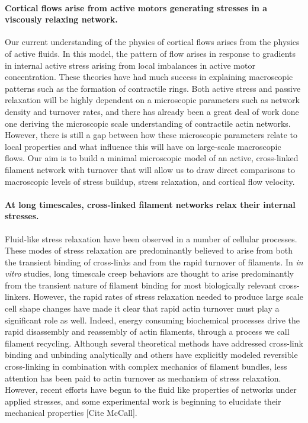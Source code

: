 \documentclass[10pt,letterpaper]{article}
\begin{document}
\paragraph{Cortical flows arise from active motors generating stresses in a viscously relaxing network.}  Our current understanding of the physics of cortical flows arises from the physics of active fluids\cite{cellmech_flows}.  In this model, the pattern of flow arises in response to gradients in internal active stress arising from local imbalances in active motor concentration\cite{PhysRevLett.106.028103}.  These theories have had much success in explaining macroscopic patterns such as the formation of contractile rings\cite{PhysRevLett.103.058102}.  Both active stress and passive relaxation will be highly dependent on a microscopic parameters such as network density and turnover rates, and there has already been a great deal of work done one deriving the microscopic scale understanding of contractile actin networks.  However, there is still a gap between how these microscopic parameters relate to local properties and what influence this will have on large-scale macroscopic flows.   Our aim is to build a minimal microscopic model of an active, cross-linked filament network with turnover that will allow us to draw direct comparisons to macroscopic levels of stress buildup, stress relaxation, and cortical flow velocity.


\paragraph{At long timescales, cross-linked filament networks relax their internal stresses.} Fluid-like stress relaxation have been observed in a number of cellular processes\cite{cellmech_flows,cellmech_flows2,cellmech_flows3,rheo_fluid,rheo_fluid2,cell_rheo_exp}.  These modes of stress relaxation are predominantly believed to arise from both the transient binding of cross-links and from the rapid turnover of filaments.  In {\em in vitro} studies, long timescale creep behaviors are thought to arise predominantly from the transient nature of filament binding for most biologically relevant cross-linkers\cite{rheo_crosslinksmatter,rheo_crosslinkslip1,rheo_crosslinkslip2,rheo_crosslinkslip3,rheo_nonaffine}.  However, the rapid rates of stress relaxation needed to produce large scale cell shape changes have made it clear that rapid actin turnover must play a significant role as well.  Indeed, energy consuming biochemical processes drive the rapid disassembly and reassembly of actin filaments, through a process we call filament recycling.   Although several theoretical methods have addressed cross-link binding and unbinding analytically \cite{theo_crosslinkslip1,theo_crosslinkslip2} and others have explicitly modeled reversible cross-linking in combination with complex mechanics of filament bundles\cite{model_taeyoon,rheo_crosslinkslip2,theo_crosslinkslip3}, less attention has been paid to actin turnover as mechanism of stress relaxation. However, recent efforts have begun to the fluid like properties of networks under applied stresses\cite{Kim2014526}, and some experimental work is beginning to elucidate their mechanical properties [Cite McCall].
\end{document}
